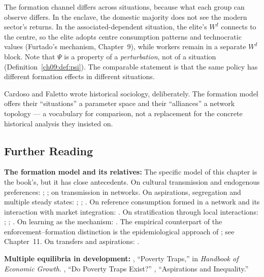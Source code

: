 \documentclass[../structural_economics_book.tex]{subfiles}
\begin{document}
The formation channel differs across situations, because what each group can observe differs. In the enclave, the domestic majority does not see the modern sector's returns. In the associated-dependent situation, the elite's $W^I$ connects to the centre, so the elite adopts centre consumption patterns and technocratic values (Furtado's mechanism, Chapter~9), while workers remain in a separate $W^I$ block. Note that $\Psi$ is a property of a \textit{perturbation}, not of a situation (Definition~\ref{ch09:def:psi}). The comparable statement is that the same policy has different formation effects in different situations.

Cardoso and Faletto wrote historical sociology, deliberately. The formation model offers their ``situations'' a parameter space and their ``alliances'' a network topology --- a vocabulary for comparison, not a replacement for the concrete historical analysis they insisted on.


\subsection*{Further Reading}

\textbf{The formation model and its relatives:} The specific model of this chapter is the book's, but it has close antecedents. On cultural transmission and endogenous preferences: \citet{bisin2001economics,bisin2011economics}; \citet{bowles1998endogenous}; \citet[\textit{GEB}]{panebianco2017paternalism} on transmission in networks. On aspirations, segregation and multiple steady states: \citet[\textit{JEEA}]{mookherjee2010aspirations}; \citet{genicot2017aspirations}; \citet[\textit{EJ}]{dalton2016poverty}. On reference consumption formed in a network and its interaction with market integration: \citet[\textit{JEEA}]{ghiglino2010keeping}. On stratification through local interactions: \citet{durlauf1996theory}; \citet{benabou1996heterogeneity}; \citet{brock2001discrete}. On learning as the mechanism: \citet[\textit{AER}]{fernandez2013cultural}. The empirical counterpart of the enforcement--formation distinction is the epidemiological approach of \citet{fernandez2009culture}; see Chapter~11. On transfers and aspirations: \citet[\textit{EJ}]{macours2014changing}.

\textbf{Multiple equilibria in development:} \citet{azariadis2005poverty}, ``Poverty Traps,'' in \textit{Handbook of Economic Growth}. \citet{kraay2014poverty}, ``Do Poverty Traps Exist?'' \citet{genicot2017aspirations}, ``Aspirations and Inequality.''
\end{document}
